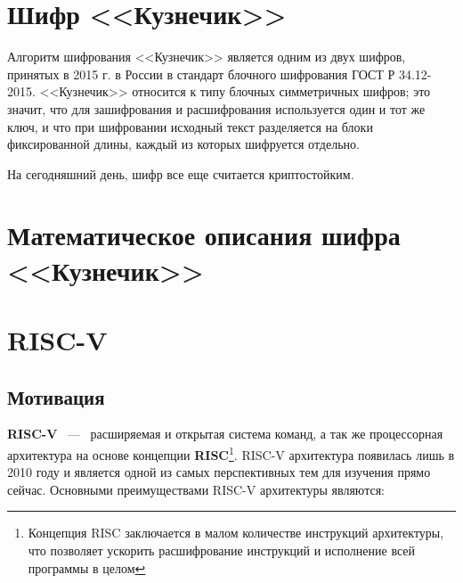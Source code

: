 \documentclass[a4paper, 12pt]{article}
\begin{document}
    \section{Шифр <<Кузнечик>>}

    Алгоритм шифрования <<Кузнечик>> является одним из двух шифров, принятых в 2015 г.
    в России в стандарт блочного шифрования ГОСТ Р 34.12-2015. <<Кузнечик>> относится
    к типу блочных симметричных шифров; это значит, что для зашифрования и
    расшифрования используется один и тот же ключ, и что при шифровании исходный текст
    разделяется на блоки фиксированной длины, каждый из которых шифруется отдельно.

    На сегодняшний день, шифр все еще считается криптостойким.

    \section{Математическое описания шифра <<Кузнечик>>}

    
    \section{RISC-V}

    \subsection{Мотивация}

    \textbf{RISC-V} ~---~ расширяемая и открытая система команд, а так же процессорная архитектура
    на основе концепции \textbf {RISC}\footnote{Концепция RISC заключается в малом количестве инструкций
    архитектуры, что позволяет ускорить расшифрование инструкций и исполнение всей программы в целом}.
    RISC-V архитектура появилась лишь в 2010 году и является одной из самых перспективных тем для изучения
    прямо сейчас. Основными преимуществами RISC-V архитектуры являются:
\end{document}
